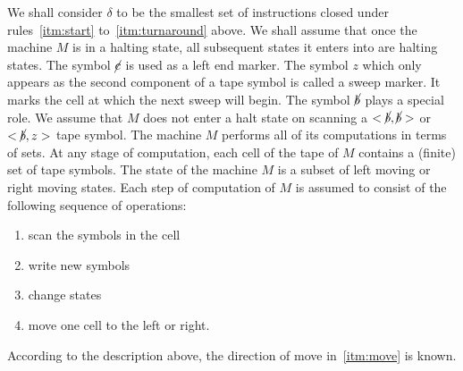 We shall consider $\delta$ to be the smallest set of instructions closed under rules~\ref{itm:start}
to~\ref{itm:turnaround} above.
We shall assume that once the machine $M$ is in a halting state, all subsequent
states it enters into are halting states.
The symbol $\cancel{c}$ is used as a left end marker.
The symbol $z$ which only appears as the second component of a tape symbol is called a sweep marker.
It marks the cell at which the next sweep will begin.
The symbol $\cancel{b}$ plays a special role.
We assume that $M$ does not enter a halt state on scanning a $<\cancel{b},\cancel{b}>$ or $<\cancel{b},z>$ tape symbol.
The machine $M$ performs all of its computations in terms of sets.
At any stage of computation, each cell of the tape of $M$ contains a (finite) set of tape symbols.
The state of the machine $M$ is a subset of left moving or right moving states.
Each step of computation of $M$ is assumed to consist of the following sequence of operations:
\begin{enumerate}[label=\alph*)]
    \item \label{itm:scan} scan the symbols in the cell
    \item \label{itm:write} write new symbols
    \item \label{itm:state} change states
    \item \label{itm:move} move one cell to the left or right.
\end{enumerate}
According to the description above, the direction of move in~\ref{itm:move} is known.


